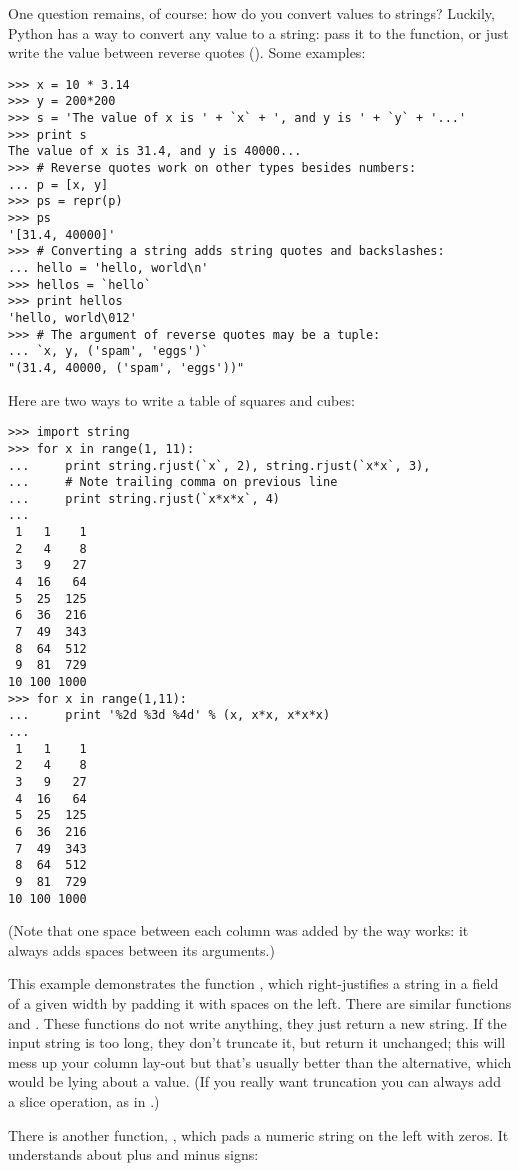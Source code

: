 \documentclass{manual}
\begin{document}
One question remains, of course: how do you convert values to strings?
Luckily, Python has a way to convert any value to a string: pass it to
the  function, or just write the value between
reverse quotes ().  Some examples:

\begin{verbatim}
>>> x = 10 * 3.14
>>> y = 200*200
>>> s = 'The value of x is ' + `x` + ', and y is ' + `y` + '...'
>>> print s
The value of x is 31.4, and y is 40000...
>>> # Reverse quotes work on other types besides numbers:
... p = [x, y]
>>> ps = repr(p)
>>> ps
'[31.4, 40000]'
>>> # Converting a string adds string quotes and backslashes:
... hello = 'hello, world\n'
>>> hellos = `hello`
>>> print hellos
'hello, world\012'
>>> # The argument of reverse quotes may be a tuple:
... `x, y, ('spam', 'eggs')`
"(31.4, 40000, ('spam', 'eggs'))"
\end{verbatim}

Here are two ways to write a table of squares and cubes:

\begin{verbatim}
>>> import string
>>> for x in range(1, 11):
...     print string.rjust(`x`, 2), string.rjust(`x*x`, 3),
...     # Note trailing comma on previous line
...     print string.rjust(`x*x*x`, 4)
...
 1   1    1
 2   4    8
 3   9   27
 4  16   64
 5  25  125
 6  36  216
 7  49  343
 8  64  512
 9  81  729
10 100 1000
>>> for x in range(1,11):
...     print '%2d %3d %4d' % (x, x*x, x*x*x)
... 
 1   1    1
 2   4    8
 3   9   27
 4  16   64
 5  25  125
 6  36  216
 7  49  343
 8  64  512
 9  81  729
10 100 1000
\end{verbatim}

(Note that one space between each column was added by the way
 works: it always adds spaces between its arguments.)

This example demonstrates the function ,
which right-justifies a string in a field of a given width by padding
it with spaces on the left.  There are similar functions
 and .  These
functions do not write anything, they just return a new string.  If
the input string is too long, they don't truncate it, but return it
unchanged; this will mess up your column lay-out but that's usually
better than the alternative, which would be lying about a value.  (If
you really want truncation you can always add a slice operation, as in
.)

There is another function, , which pads a
numeric string on the left with zeros.  It understands about plus and
minus signs:
\end{document}
